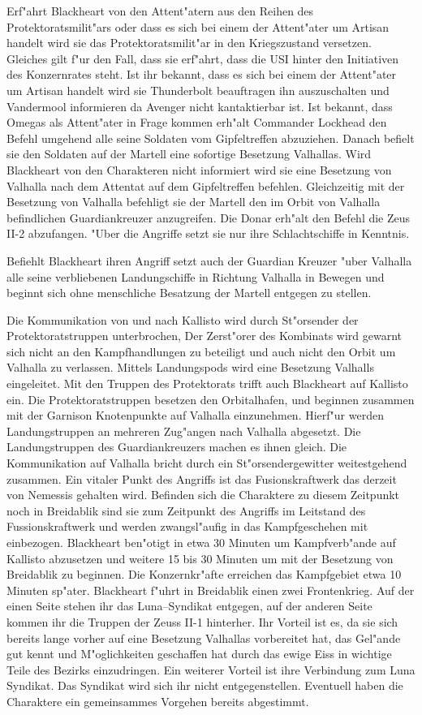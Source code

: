 Erf"ahrt Blackheart von den Attent"atern aus den Reihen des Protektoratsmilit"ars oder dass es sich bei einem der Attent"ater um Artisan handelt wird sie das Protektoratsmilit"ar in den Kriegszustand versetzen. Gleiches gilt f"ur den Fall, dass sie erf"ahrt, dass die USI hinter den Initiativen des Konzernrates steht. Ist ihr bekannt, dass es sich bei einem der Attent"ater um Artisan handelt wird sie Thunderbolt beauftragen ihn auszuschalten und Vandermool informieren da Avenger nicht kantaktierbar ist. Ist bekannt, dass Omegas als Attent"ater in Frage kommen erh"alt Commander Lockhead den Befehl umgehend alle seine Soldaten vom Gipfeltreffen abzuziehen. Danach befielt sie den Soldaten auf der Martell eine sofortige Besetzung Valhallas. Wird Blackheart von den Charakteren nicht informiert wird sie eine Besetzung von Valhalla nach dem Attentat auf dem Gipfeltreffen befehlen. Gleichzeitig mit der Besetzung von Valhalla befehligt sie der Martell den im Orbit von Valhalla befindlichen Guardiankreuzer anzugreifen. Die Donar erh"alt den Befehl die Zeus II-2 abzufangen. "Uber die Angriffe setzt sie nur ihre Schlachtschiffe in Kenntnis.

Befiehlt Blackheart ihren Angriff setzt auch der Guardian Kreuzer "uber Valhalla alle seine verbliebenen Landungschiffe in Richtung Valhalla in Bewegen und beginnt sich ohne menschliche Besatzung der Martell entgegen zu stellen.

Die Kommunikation von und nach Kallisto wird durch St"orsender der Protektoratstruppen unterbrochen, Der Zerst"orer des Kombinats wird gewarnt sich nicht an den Kampfhandlungen zu beteiligt und auch nicht den Orbit um Valhalla zu verlassen. Mittels Landungspods wird eine Besetzung Valhalls eingeleitet. Mit den Truppen des Protektorats trifft auch Blackheart auf Kallisto ein. Die Protektoratstruppen besetzen den Orbitalhafen, und beginnen zusammen mit der Garnison  Knotenpunkte auf Valhalla einzunehmen. Hierf"ur werden Landungstruppen an mehreren Zug"angen nach Valhalla abgesetzt. Die Landungstruppen des Guardiankreuzers machen es ihnen gleich. Die Kommunikation auf Valhalla bricht durch ein St"orsendergewitter weitestgehend zusammen. Ein vitaler Punkt des Angriffs ist das Fusionskraftwerk das derzeit von Nemessis gehalten wird. Befinden sich die Charaktere zu diesem Zeitpunkt noch in Breidablik sind sie zum Zeitpunkt des Angriffs im Leitstand des Fussionskraftwerk  und werden zwangsl"aufig in das Kampfgeschehen mit einbezogen. Blackheart ben"otigt in etwa 30 Minuten um Kampfverb"ande auf Kallisto abzusetzen und weitere 15 bis 30 Minuten um mit der Besetzung von Breidablik zu beginnen. Die Konzernkr"afte erreichen das Kampfgebiet etwa 10 Minuten sp"ater. Blackheart f"uhrt in Breidablik einen zwei Frontenkrieg. Auf der einen Seite stehen ihr das Luna--Syndikat entgegen, auf der anderen Seite kommen ihr die Truppen der Zeuss II-1 hinterher. Ihr Vorteil ist es, da\3 sie sich bereits lange vorher auf eine Besetzung Valhallas vorbereitet hat, das Gel"ande gut kennt und M"oglichkeiten geschaffen hat durch das ewige Eiss in wichtige Teile des Bezirks einzudringen. Ein weiterer Vorteil ist ihre Verbindung zum Luna Syndikat. Das Syndikat wird sich ihr nicht entgegenstellen. Eventuell haben die Charaktere ein gemeinsammes Vorgehen bereits abgestimmt.

